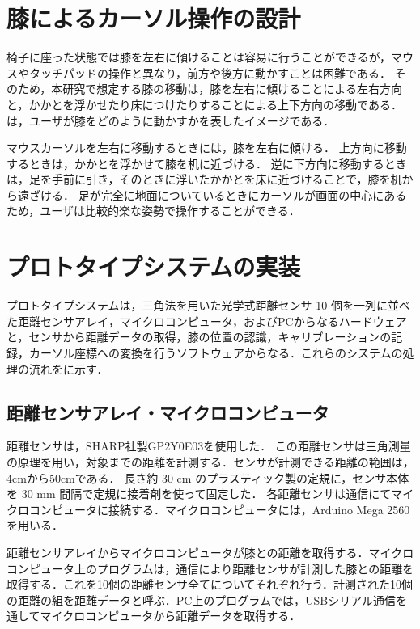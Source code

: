 \documentclass[submit, techrep]{ipsj}
\begin{document}
\section{膝によるカーソル操作の設計}
椅子に座った状態では膝を左右に傾けることは容易に行うことができるが，マウスやタッチパッドの操作と異なり，前方や後方に動かすことは困難である．
そのため，本研究で想定する膝の移動は，膝を左右に傾けることによる左右方向と，かかとを浮かせたり床につけたりすることによる上下方向の移動である．
は，ユーザが膝をどのように動かすかを表したイメージである．

マウスカーソルを左右に移動するときには，膝を左右に傾ける．
上方向に移動するときは，かかとを浮かせて膝を机に近づける．
逆に下方向に移動するときは，足を手前に引き，そのときに浮いたかかとを床に近づけることで，膝を机から遠ざける．
足が完全に地面についているときにカーソルが画面の中心にあるため，ユーザは比較的楽な姿勢で操作することができる．

\section{プロトタイプシステムの実装}
プロトタイプシステムは，三角法を用いた光学式距離センサ 10 個を一列に並べた距離センサアレイ，マイクロコンピュータ，およびPCからなるハードウェアと，センサから距離データの取得，膝の位置の認識，キャリブレーションの記録，カーソル座標への変換を行うソフトウェアからなる．これらのシステムの処理の流れをに示す．\par




\subsection{距離センサアレイ・マイクロコンピュータ}
距離センサは，SHARP社製GP2Y0E03を使用した．
この距離センサは三角測量の原理を用い，対象までの距離を計測する．センサが計測できる距離の範囲は，4\si{cm}から50\si{cm}である．
長さ約 30 \si{cm} のプラスティック製の定規に，センサ本体を 30 \si{mm} 間隔で定規に接着剤を使って固定した．
各距離センサは\iic 通信にてマイクロコンピュータに接続する．マイクロコンピュータには，Arduino Mega 2560を用いる．\par
距離センサアレイからマイクロコンピュータが膝との距離を取得する．マイクロコンピュータ上のプログラムは，\iic 通信により距離センサが計測した膝との距離を取得する．これを10個の距離センサ全てについてそれぞれ行う．計測された10個の距離の組を距離データと呼ぶ．PC上のプログラムでは，USBシリアル通信を通してマイクロコンピュータから距離データを取得する．
\end{document}
